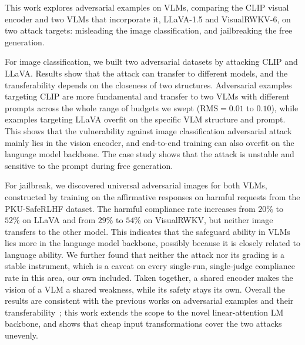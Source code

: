 \documentclass[conference]{IEEEtran}
\begin{document}
This work explores adversarial examples on VLMs, comparing the CLIP visual
encoder and two VLMs that incorporate it, LLaVA-1.5 and VisualRWKV-6, on
two attack targets: misleading the image classification, and jailbreaking
the free generation.

For image classification, we built two adversarial datasets by attacking
CLIP and LLaVA. Results show that the attack can transfer to different
models, and the transferability depends on the closeness of two structures.
Adversarial examples targeting CLIP are more fundamental and transfer to
two VLMs with different prompts across the whole range of budgets we swept
($\mathrm{RMS}=0.01$ to $0.10$), while examples targeting LLaVA overfit on
the specific VLM structure and prompt. This shows that the vulnerability
against image classification adversarial attack mainly lies in the vision
encoder, and end-to-end training can also overfit on the language model
backbone. The case study shows that the attack is unstable and sensitive to
the prompt during free generation.

For jailbreak, we discovered universal adversarial images for both VLMs,
constructed by training on the affirmative responses on harmful requests
from the PKU-SafeRLHF dataset. The harmful compliance rate increases from
$20\%$ to $52\%$ on LLaVA and from $29\%$ to $54\%$ on VisualRWKV, but
neither image transfers to the other model. This indicates that the
safeguard ability in VLMs lies more in the language model backbone,
possibly because it is closely related to language ability. We further
found that neither the attack nor its grading is a stable instrument, which
is a caveat on every single-run, single-judge compliance rate in this area,
our own included. Taken together, a shared encoder makes the vision of a
VLM a shared weakness, while its safety stays its own. Overall the results
are consistent with the previous
works on adversarial examples and their
transferability~\cite{Zhao2023EvalAdvVLM, Schaeffer2025}; this work extends
the scope to the novel linear-attention LM backbone, and shows that cheap
input transformations cover the two attacks unevenly.



\end{document}
